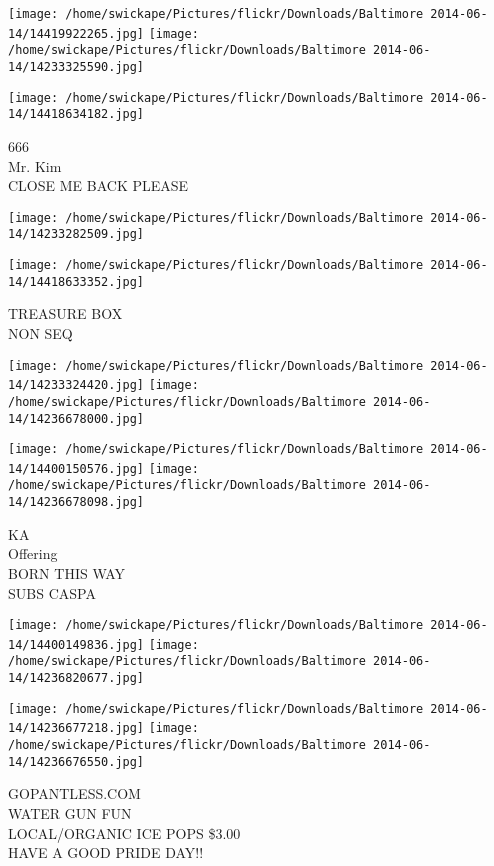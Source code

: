\documentclass[10pt,letterpaper]{article}
\begin{document}
\texttt{[image: /home/swickape/Pictures/flickr/Downloads/Baltimore 2014-06-14/14419922265.jpg]}
\texttt{[image: /home/swickape/Pictures/flickr/Downloads/Baltimore 2014-06-14/14233325590.jpg]}

\vspace{0.25in}
\texttt{[image: /home/swickape/Pictures/flickr/Downloads/Baltimore 2014-06-14/14418634182.jpg]}

666\\
Mr. Kim\\
CLOSE ME BACK PLEASE
\pagebreak

\texttt{[image: /home/swickape/Pictures/flickr/Downloads/Baltimore 2014-06-14/14233282509.jpg]}

\vspace{0.25in}
\texttt{[image: /home/swickape/Pictures/flickr/Downloads/Baltimore 2014-06-14/14418633352.jpg]}

TREASURE BOX\\
NON SEQ
\pagebreak

\texttt{[image: /home/swickape/Pictures/flickr/Downloads/Baltimore 2014-06-14/14233324420.jpg]}
\texttt{[image: /home/swickape/Pictures/flickr/Downloads/Baltimore 2014-06-14/14236678000.jpg]}

\texttt{[image: /home/swickape/Pictures/flickr/Downloads/Baltimore 2014-06-14/14400150576.jpg]}
\texttt{[image: /home/swickape/Pictures/flickr/Downloads/Baltimore 2014-06-14/14236678098.jpg]}

KA\\
Offering\\
BORN THIS WAY\\
SUBS CASPA
\pagebreak

\texttt{[image: /home/swickape/Pictures/flickr/Downloads/Baltimore 2014-06-14/14400149836.jpg]}
\texttt{[image: /home/swickape/Pictures/flickr/Downloads/Baltimore 2014-06-14/14236820677.jpg]}

\texttt{[image: /home/swickape/Pictures/flickr/Downloads/Baltimore 2014-06-14/14236677218.jpg]}
\texttt{[image: /home/swickape/Pictures/flickr/Downloads/Baltimore 2014-06-14/14236676550.jpg]}

GOPANTLESS.COM\\
WATER GUN FUN\\
LOCAL/ORGANIC ICE POPS \$3.00\\
HAVE A GOOD PRIDE DAY!!
\pagebreak
\end{document}
